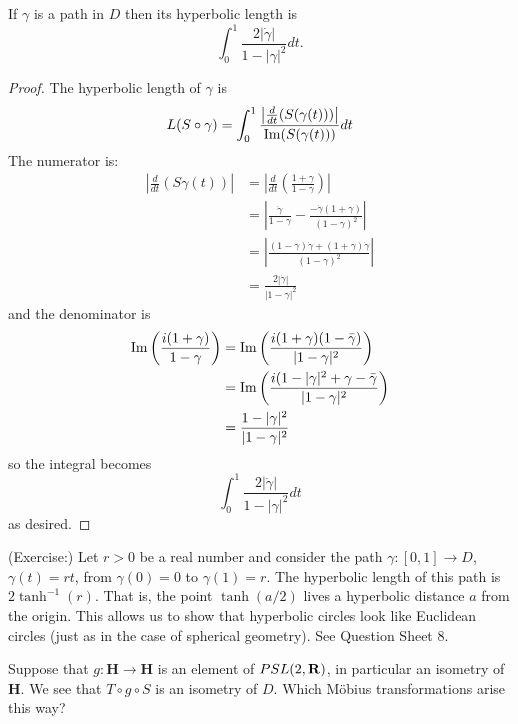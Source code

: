\documentclass[12pt]{article}
\begin{document}
\begin{lma}
  If $\gamma$ is a path in $D$ then its hyperbolic length is
  \[\int_0^1\frac{2|\dot{\gamma}|}{1-|\gamma|^2}dt.\]
\end{lma}
\begin{proof}
  The hyperbolic length of $\gamma$ is
  \[L(S\circ\gamma)=\int_0^1\frac{\left|\frac{d}{dt}(S(\gamma(t)))\right|}{\operatorname{Im}(S(\gamma(t)))}dt\]
  The numerator is:
  \begin{align*}
    \left|\frac{d}{dt}(S\gamma(t))\right|&=\left|\frac{d}{dt}\left(\frac{1+\gamma}{1-\gamma}\right)\right|\\
    &=\left|\frac{\dot{\gamma}}{1-\gamma}-\frac{-\dot{\gamma}(1+\gamma)}{(1-\gamma)^2}\right|\\
    &=\left|\frac{(1-\gamma)\dot{\gamma}+(1+\gamma)\dot{\gamma}}{(1-\gamma)^2}\right|\\
    &=\frac{2|\dot{\gamma}|}{|1-\gamma|^2}
  \end{align*}
  and the denominator is
  \begin{align*}
    \operatorname{Im}\left(\frac{i(1+\gamma)}{1-\gamma}\right)&=\operatorname{Im}\left(\frac{i(1+\gamma)(1-\bar{\gamma})}{|1-\gamma|^2}\right)\\
    &=\operatorname{Im}\left(\frac{i(1-|\gamma|^2+\gamma-\bar{\gamma}}{|1-\gamma|^2}\right)\\
    &=\frac{1-|\gamma|^2}{|1-\gamma|^2}
  \end{align*}
  so the integral becomes
  \[\int_0^1\frac{2|\dot{\gamma}|}{1-|\gamma|^2}dt\]
  as desired.
\end{proof}

\begin{exm}\label{exm:lngth}
  (Exercise:) Let $r>0$ be a real number and consider the path $\gamma\colon[0,1]\to D$, $\gamma(t)=rt$, from $\gamma(0)=0$ to $\gamma(1)=r$. The hyperbolic length of this path is $2\tanh^{-1}(r)$. That is, the point $\tanh(a/2)$ lives a hyperbolic distance $a$ from the origin. This allows us to show that hyperbolic circles look like Euclidean circles (just as in the case of spherical geometry). See Question Sheet 8.
\end{exm}

Suppose that $g\colon\mathbf{H}\to\mathbf{H}$ is an element of $PSL(2,\mathbf{R})$, in particular an isometry of $\mathbf{H}$. We see that $T\circ g\circ S$ is an isometry of $D$. Which M\"obius transformations arise this way?
\end{document}
